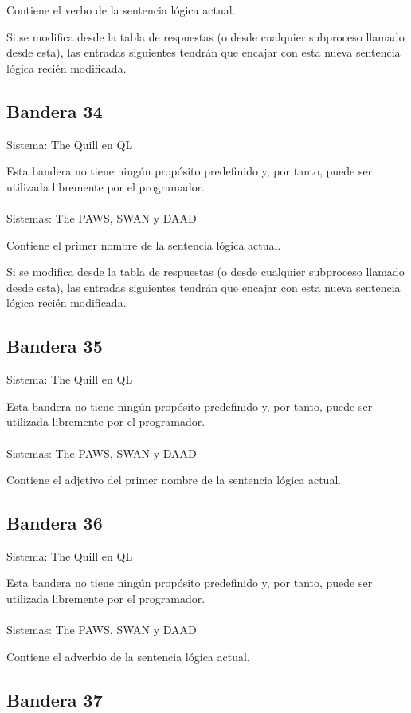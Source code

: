 \documentclass[11pt, a5paper]{article}
\newcommand{\quill}{\textsf{The Quill}\xspace}
\newcommand{\paw}{\textsf{The PAWS}\xspace}
\newcommand{\swan}{\textsf{SWAN}\xspace}
\newcommand{\daad}{\textsf{DAAD}\xspace}
\newcommand{\sistema}[1]{\noindent Sistema: #1 \nopagebreak}
\newcommand{\sistemas}[1]{\noindent Sistemas: #1 \nopagebreak}
\begin{document}
Contiene el verbo de la sentencia lógica actual.

Si se modifica desde la tabla de respuestas (o desde cualquier subproceso llamado desde esta), las entradas siguientes tendrán que encajar con esta nueva sentencia lógica recién modificada.

\subsection{Bandera 34}

\sistema{\quill en QL}

Esta bandera no tiene ningún propósito predefinido y, por tanto, puede ser utilizada libremente por el programador.
\\\ \\
\sistemas{\paw, \swan y \daad}

Contiene el primer nombre de la sentencia lógica actual.

Si se modifica desde la tabla de respuestas (o desde cualquier subproceso llamado desde esta), las entradas siguientes tendrán que encajar con esta nueva sentencia lógica recién modificada.

\subsection{Bandera 35}

\sistema{\quill en QL}

Esta bandera no tiene ningún propósito predefinido y, por tanto, puede ser utilizada libremente por el programador.
\\\ \\
\sistemas{\paw, \swan y \daad}

Contiene el adjetivo del primer nombre de la sentencia lógica actual.

\subsection{Bandera 36}

\sistema{\quill en QL}

Esta bandera no tiene ningún propósito predefinido y, por tanto, puede ser utilizada libremente por el programador.
\\\ \\
\sistemas{\paw, \swan y \daad}

Contiene el adverbio de la sentencia lógica actual.

\subsection{Bandera 37}
\end{document}
